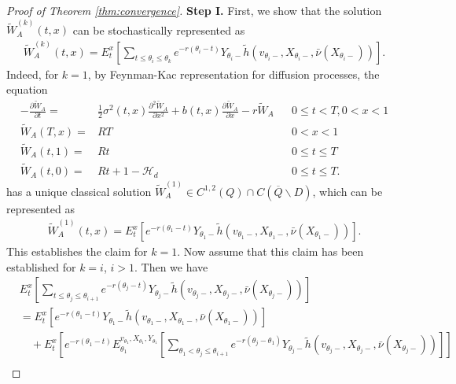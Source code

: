 \documentclass[11pt]{article}%
\numberwithin{equation}{section}
\theoremstyle{plain}
\begin{document}
\begin{appendices}
\begin{proof}[Proof of Theorem \ref{thm:convergence}]
	{\bf Step I.} First, we show that the solution $\tilde{W}_A^{(k)}(t,x)$ can be stochastically represented as
	\begin{align*}
		\tilde{W}_A^{(k)}(t,x)=E_t^x\left[\sum_{t\le \theta_i\le \theta_k}e^{-r(\theta_i-t)}Y_{\theta_i-}\tilde{h}(v_{\theta_i-},X_{\theta_i-},\bar{\nu}(X_{\theta_i-}))\right].
	\end{align*}
	Indeed, for $k=1$, by Feynman-Kac representation for diffusion processes, the equation
	\begin{align*}
	-\frac{\partial \tilde{W}_{A}}{\partial t}= & \frac{1}{2}\sigma^{2}(t,x)\frac{\partial^{2}\tilde{W}_{A}}{\partial x^{2}}+b(t,x)\frac{\partial \tilde{W}_{A}}{\partial x}-r \tilde{W}_{A} &  & 0\le t<T,0<x<1\\
	\tilde{W}_{A}(T,x)= & RT &  & 0<x<1\\
	\tilde{W}_{A}(t,1)= & Rt&  & 0\le t\le T\\
	\tilde{W}_{A}(t,0)= & Rt+1-\mathcal{H}_{d} &  & 0\le t\le T.
	\end{align*}
	has a unique classical solution $\tilde{W}_A^{(1)}\in C^{1,2}(Q)\cap C(\overline{Q}\backslash D)$, which can be represented as
	\begin{align*}
		\tilde{W}_A^{(1)}(t,x)=E_t^x\left[e^{-r(\theta_1-t)}Y_{\theta_1-}\tilde{h}(v_{\theta_1-},X_{\theta_1-},\bar{\nu}(X_{\theta_1-}))\right].
	\end{align*}
	This establishes the claim for $k=1$. Now assume that this claim has been established for $k=i$, $i>1$. Then we have
	\begin{align*}
		&E_t^x\left[\sum_{t\le \theta_j\le \theta_{i+1}}e^{-r(\theta_j-t)}Y_{\theta_j-}\tilde{h}(v_{\theta_j-},X_{\theta_j-},\bar{\nu}(X_{\theta_j-}))\right]\\
		&=E_t^x\left[e^{-r(\theta_{1}-t)}Y_{\theta_{1}-}\tilde{h}(v_{\theta_{1}-},X_{\theta_{1}-},\bar{\nu}(X_{\theta_{1}-}))\right]\\
		&\quad+E_t^x\left[e^{-r(\theta_1-t)}E_{\theta_1}^{v_{\theta_1},X_{\theta_1},Y_{\theta_1}}\left[\sum_{\theta_1< \theta_j\le \theta_{i+1} }e^{-r(\theta_j-\theta_1)}Y_{\theta_j-}\tilde{h}(v_{\theta_j-},X_{\theta_j-},\bar{\nu}(X_{\theta_j-}))\right]\right]\\

\end{align*}
\end{proof}
\end{appendices}
\end{document}
